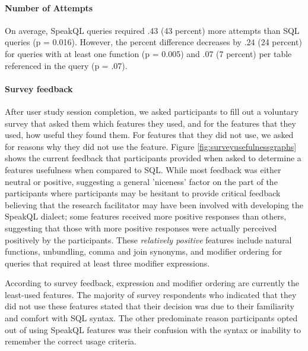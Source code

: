 \paragraph{Number of Attempts} On average, SpeakQL queries required .43 (43 percent) more attempts than SQL queries (p = 0.016). However, the percent difference decreases by .24 (24 percent) for queries with at least one function (p = 0.005) and .07 (7 percent) per table referenced in the query (p = .07).

\paragraph{Survey feedback}

After user study session completion, we asked participants to fill out a voluntary survey that asked them which features they used, and for the features that they used, how useful they found them. For features that they did not use, we asked for reasons why they did not use the feature. Figure \ref{fig:surveyusefulnessgraphs} shows the current feedback that participants provided when asked to determine a features usefulness when compared to SQL. While most feedback was either neutral or positive, suggesting a general 'niceness' factor on the part of the participants where participants may be hesitant to provide critical feedback believing that the research facilitator may have been involved with developing the SpeakQL dialect; some features received more positive responses than others, suggesting that those with more positive responses were actually perceived positively by the participants. These \emph{relatively positive} features include natural functions, unbundling, comma and join synonyms, and modifier ordering for queries that required at least three modifier expressions.

According to survey feedback, expression and modifier ordering are currently the least-used features. The majority of survey respondents who indicated that they did not use these features stated that their decision was due to their familiarity and comfort with SQL syntax. The other predominate reason participants opted out of using SpeakQL features was their confusion with the syntax or inability to remember the correct usage criteria.

